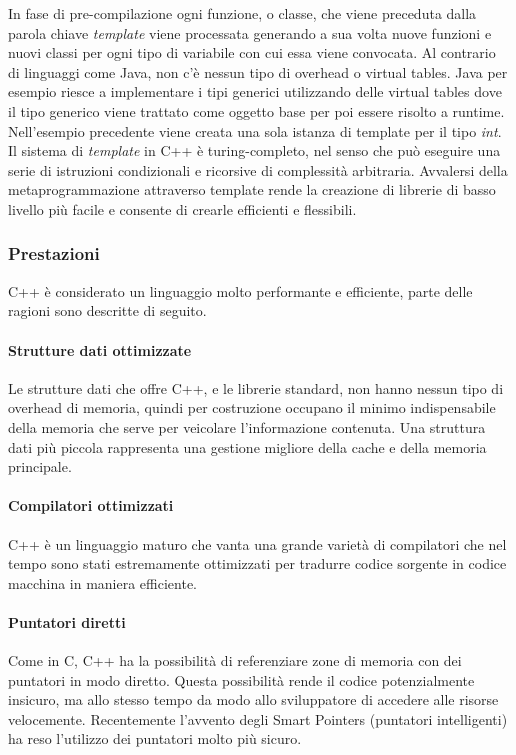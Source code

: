     In fase di pre-compilazione ogni funzione, o classe, che viene preceduta dalla parola chiave \textit{template}
    viene processata generando a sua volta nuove funzioni e nuovi classi per ogni tipo di variabile con cui essa viene convocata. Al contrario di linguaggi come Java, non c'è nessun tipo di
    overhead o virtual tables. Java per esempio riesce a implementare i tipi generici utilizzando delle virtual tables dove il tipo generico viene trattato come oggetto base per poi essere
    risolto a runtime. Nell'esempio precedente viene creata una sola istanza di template per il tipo \textit{int}.
    Il sistema di \textit{template} in C++ è turing-completo, nel senso che può eseguire
    una serie di istruzioni condizionali e ricorsive di complessità arbitraria.
    Avvalersi della metaprogrammazione attraverso template rende la creazione di
    librerie di basso livello più facile e consente di crearle efficienti e flessibili.

    \subsubsection{Prestazioni}
    C++ è considerato un linguaggio molto performante e efficiente, parte delle ragioni sono descritte di seguito.

    \paragraph{Strutture dati ottimizzate}
    Le strutture dati che offre C++, e le librerie standard, non hanno nessun tipo di overhead di memoria,
    quindi per costruzione occupano il minimo indispensabile della memoria che serve per veicolare
    l'informazione contenuta. Una struttura dati più piccola rappresenta una gestione migliore della cache e
    della memoria principale.
    \par

    \paragraph{Compilatori ottimizzati}
    C++ è un linguaggio maturo che vanta una grande varietà di compilatori che nel tempo sono stati estremamente ottimizzati
    per tradurre codice sorgente in codice macchina in maniera efficiente.
    \par

    \paragraph{Puntatori diretti}
    Come in C, C++ ha la possibilità di referenziare zone di memoria con dei puntatori in modo diretto.
    Questa possibilità rende il codice potenzialmente insicuro, ma allo stesso tempo da modo allo sviluppatore
    di accedere alle risorse velocemente. Recentemente l'avvento degli Smart Pointers (puntatori intelligenti)
    ha reso l'utilizzo dei puntatori molto più sicuro.
    \par




